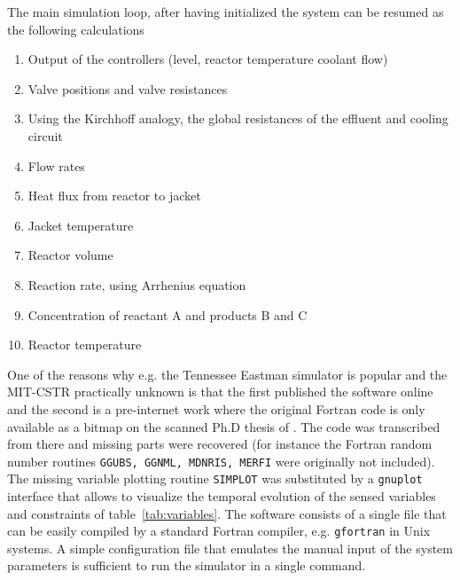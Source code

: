 \documentclass[10pt, conference, compsocconf]{IEEEtran}
\newcommand{\reftab}[1]{table~\ref{tab:#1}}
\begin{document}
The main simulation loop, after having initialized the system
can be resumed as the following calculations
\begin{enumerate}
\item Output of the controllers
(level, reactor temperature coolant flow)
\item Valve positions and valve resistances
\item Using the Kirchhoff analogy, the global resistances of the
effluent and cooling circuit
\item Flow rates
\item Heat flux from reactor to jacket
\item Jacket temperature
\item Reactor volume
\item Reaction rate, using Arrhenius equation
\item Concentration of reactant A and products B and C
\item Reactor temperature
\end{enumerate}

One of the reasons why e.g. the Tennessee Eastman simulator
is popular and the MIT-CSTR practically unknown is that the
first published the software online and the second is a
pre-internet work where the original Fortran code
is only available as a bitmap on the scanned Ph.D thesis
of \cite{phdthesisFinch1989}.
The code was transcribed from there and missing parts
were recovered (for instance the Fortran random number routines 
\texttt{GGUBS, GGNML, MDNRIS, MERFI} were originally not included).
The missing variable plotting routine \texttt{SIMPLOT}
was substituted by a \texttt{gnuplot} interface that
allows to visualize the temporal evolution of the
sensed variables and constraints of \reftab{variables}.
The software
consists of a single file that can be easily compiled
by a standard Fortran compiler, e.g. \texttt{gfortran}
in Unix systems. A simple configuration file that emulates
the manual input of the system parameters is sufficient
to run the simulator in a single command.





\end{document}
